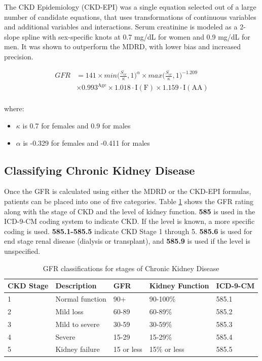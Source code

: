 \documentclass[12pt]{ociamthesis}\usepackage[]{graphicx}\usepackage[]{color}
\begin{document}
The CKD Epidemiology (CKD-EPI) was a single equation selected out of a large number of candidate equations, that uses transformations of continuous
variables and additional variables and interactions. Serum creatinine is modeled as a 2-slope spline with sex-specific knots at 0.7 mg/dL for women 
and 0.9 mg/dL for men. It was shown to outperform the MDRD, with lower bias and increased precision.  \cite{Levey2009, eGFR2018}

\begin{equation} \label{ckdepi}
\begin{split}
  GFR &= 141 \times min\bigg(\frac{S_{cr}}{\kappa}, 1\bigg)^{\alpha} \times max\bigg(\frac{S_{cr}}{\kappa}, 1\bigg)^{-1.209} \\
      &\times 0.993^{\text{Age}} \times 1.018 \cdot \text{I}(\text{F}) \times 1.159 \cdot \text{I}(\text{AA}) \\
\end{split}
\end{equation}

where:
\begin{itemize}
  \item $\kappa$ is 0.7 for females and 0.9 for males
  \item $\alpha$ is -0.329 for females and -0.411 for males
\end{itemize} \cite{Levey2009}

\subsection{Classifying Chronic Kidney Disease}

Once the GFR is calculated using either the MDRD or the CKD-EPI formulas, 
patients can be placed into one of five categories. Table \ref{tab:gfr} shows the 
GFR rating along with the stage of CKD and the level of kidney function. \textbf{585} is used in the ICD-9-CM coding system
to indicate CKD. If the level is known, a more specific coding is used. \textbf{585.1-585.5} indicate CKD Stage 1 through 5.
\textbf{585.6} is used for end stage renal disease (dialysis or transplant), and \textbf{585.9} is used if the level is unspecified.

\begin{table}[]
\centering
\label{my-label}
\begin{tabular}{lllll}
CKD Stage & Description             & GFR        & Kidney Function & ICD-9-CM \\
\hline
1         & Normal function         & 90+        & 90-100\%        & 585.1    \\
2         & Mild loss               & 60-89      & 60-89\%         & 585.2    \\
3         & Mild to severe          & 30-59      & 30-59\%         & 585.3    \\
4         & Severe                  & 15-29      & 15-29\%         & 585.4    \\
5         & Kidney failure          & 15 or less & 15\% or less    & 585.5    \\
\end{tabular}\caption{GFR classifications for stages of Chronic Kidney Disease}\label{tab:gfr}
\end{table}
\end{document}
